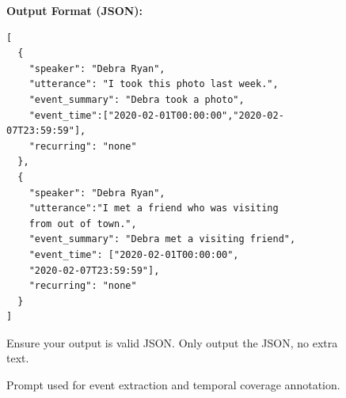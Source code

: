 \documentclass{article} %
\begin{document}
\begin{figure}[t]
\begin{tcolorbox}[
colframe=black!75!white,
colback=white, sharp corners,
boxrule=0.8pt, width=\textwidth,
title=Prompt for Event Extraction and Time Coverage Annotation
]
\textbf{Output Format (JSON):}
\begin{verbatim}
[
  {
    "speaker": "Debra Ryan",
    "utterance": "I took this photo last week.",
    "event_summary": "Debra took a photo",
    "event_time":["2020-02-01T00:00:00","2020-02-07T23:59:59"],
    "recurring": "none"
  },
  {
    "speaker": "Debra Ryan",
    "utterance":"I met a friend who was visiting 
    from out of town.",
    "event_summary": "Debra met a visiting friend",
    "event_time": ["2020-02-01T00:00:00", 
    "2020-02-07T23:59:59"],
    "recurring": "none"
  }
]
\end{verbatim}

Ensure your output is valid JSON. Only output the JSON, no extra text.

\end{tcolorbox}
\caption{Prompt used for event extraction and temporal coverage annotation.}
\label{fig:event-extraction-prompt}
\end{figure}
\end{document}
